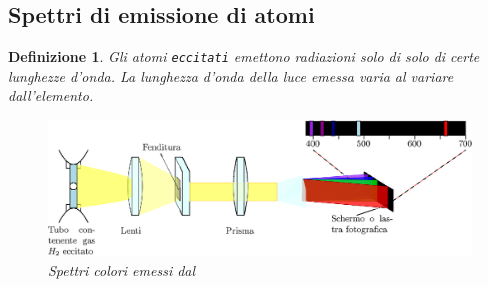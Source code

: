 \documentclass{book}
\newtheorem{defi}{Definizione}[section]
\begin{document}
\subsection{Spettri di emissione di atomi}
\label{sec:spemdiatom}

\begin{defi}
  Gli atomi \texttt{eccitati} emettono radiazioni solo di solo di certe lunghezze d'onda. La lunghezza d'onda
  della luce emessa varia al variare dall'elemento.
  \begin{figure}[ht!]
    \centering
    \includegraphics[width=14cm]{img/spettriColatom.eps}
    \caption{Spettri colori emessi dal }
    \label{fig:h2spttricolor}
  \end{figure}
\end{defi}
\end{document}
